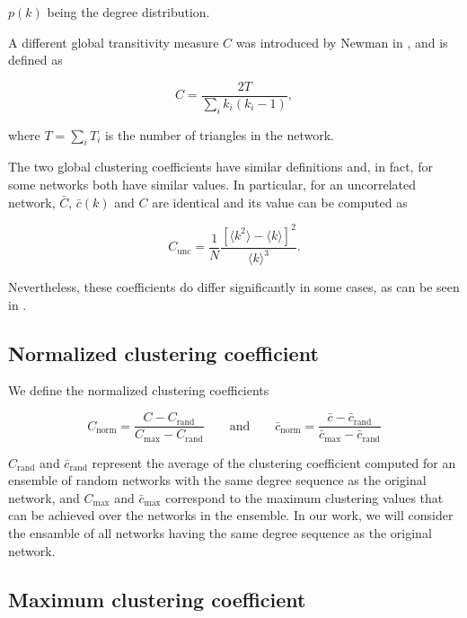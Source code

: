 \documentclass{article}
\begin{document}
$p(k)$ being the degree distribution.

A different global transitivity measure $C$ was introduced by Newman in \cite{Newman2003}, and is defined as 

\begin{equation}
    C = \dfrac{2T}{\sum_i k_i (k_i-1)},
\end{equation}

where $T = \sum_i T_i$ is the number of triangles in the network.

The two global clustering coefficients have similar definitions and, in fact, for some networks both have similar values. In particular, for an uncorrelated network, $\bar{C}$, $\bar{c}(k)$ and $C$ are identical and its value can be computed as \cite{NewmanBook} 

\begin{equation} \label{eq:Cnorm}
C_{\mathrm{unc}} = \dfrac{1}{N} \dfrac{\left[ \langle k^2 \rangle - \langle k \rangle  \right]^2}{\langle k \rangle^3}.
\end{equation}

Nevertheless, these coefficients do differ significantly in some cases, as can be seen in \cite{Bollobs2004, Estrada2011}.

\subsection{Normalized clustering coefficient}

We define the normalized clustering coefficients

\begin{equation}
C_{\mathrm{norm}} = \dfrac{C - C_{\mathrm{rand}}}{C_{\mathrm{max}} - C_{\mathrm{rand}}}\qquad \text{and} \qquad
\bar{c}_{\mathrm{norm}} = \dfrac{\bar{c} - \bar{c}_{\mathrm{rand}}}{\bar{c}_{\mathrm{max}} - \bar{c}_{\mathrm{rand}}}
\end{equation}

$C_{\mathrm{rand}}$ and $\bar{c}_{\mathrm{rand}}$ represent the average of the clustering coefficient computed for an ensemble of random networks with the same degree sequence as the original network, and $C_{\mathrm{max}}$ and $\bar{c}_{\mathrm{max}}$ correspond to the maximum clustering values that can be achieved over the networks in the ensemble. In our work, we will consider the ensamble of all networks having the same degree sequence as the original network.

\subsection{Maximum clustering coefficient}
\end{document}
